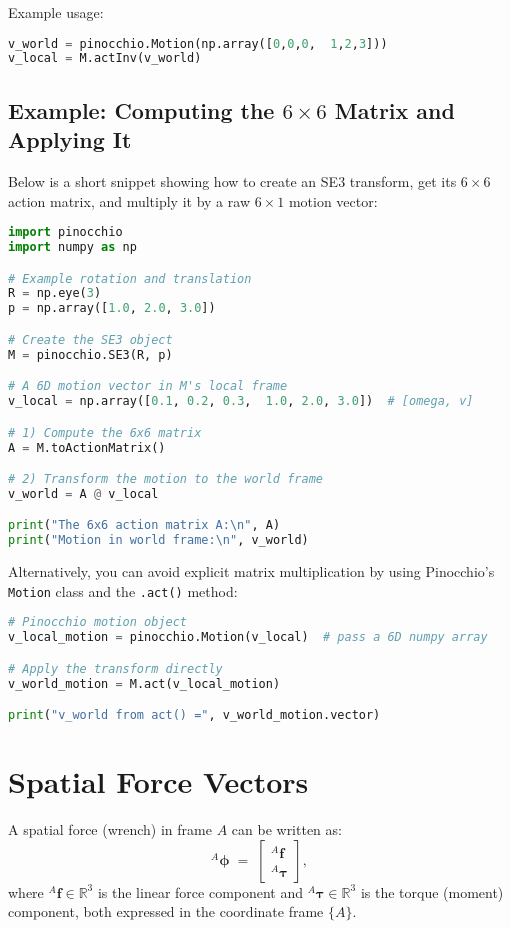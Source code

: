 \documentclass[10pt]{article}
\begin{document}
Example usage:
\begin{lstlisting}[language=Python]
v_world = pinocchio.Motion(np.array([0,0,0,  1,2,3]))
v_local = M.actInv(v_world)
\end{lstlisting}

\subsection*{Example: Computing the $6\times6$ Matrix and Applying It}

Below is a short snippet showing how to create an SE3 transform, get its \(6\times6\) action matrix, and multiply it by a raw \(6\times1\) motion vector:

\begin{lstlisting}[language=Python]
import pinocchio
import numpy as np

# Example rotation and translation
R = np.eye(3)
p = np.array([1.0, 2.0, 3.0])

# Create the SE3 object
M = pinocchio.SE3(R, p)

# A 6D motion vector in M's local frame
v_local = np.array([0.1, 0.2, 0.3,  1.0, 2.0, 3.0])  # [omega, v]

# 1) Compute the 6x6 matrix
A = M.toActionMatrix()

# 2) Transform the motion to the world frame
v_world = A @ v_local

print("The 6x6 action matrix A:\n", A)
print("Motion in world frame:\n", v_world)
\end{lstlisting}

Alternatively, you can avoid explicit matrix multiplication by using Pinocchio's \texttt{Motion} class and the \texttt{.act()} method:

\begin{lstlisting}[language=Python]
# Pinocchio motion object
v_local_motion = pinocchio.Motion(v_local)  # pass a 6D numpy array

# Apply the transform directly
v_world_motion = M.act(v_local_motion)

print("v_world from act() =", v_world_motion.vector)
\end{lstlisting}


\section*{Spatial Force Vectors}

A spatial force (wrench) in frame \(A\) can be written as:
\[
{}^{A}\!\boldsymbol{\phi}
\;=\;
\begin{bmatrix}
{}^{A}\mathbf{f}\\[4pt]
{}^{A}\boldsymbol{\tau}
\end{bmatrix},
\]
where \({}^{A}\mathbf{f}\in\mathbb{R}^3\) is the linear force component and \({}^{A}\boldsymbol{\tau}\in\mathbb{R}^3\) is the torque (moment) component, both expressed in the coordinate frame \(\{A\}\).
\end{document}
